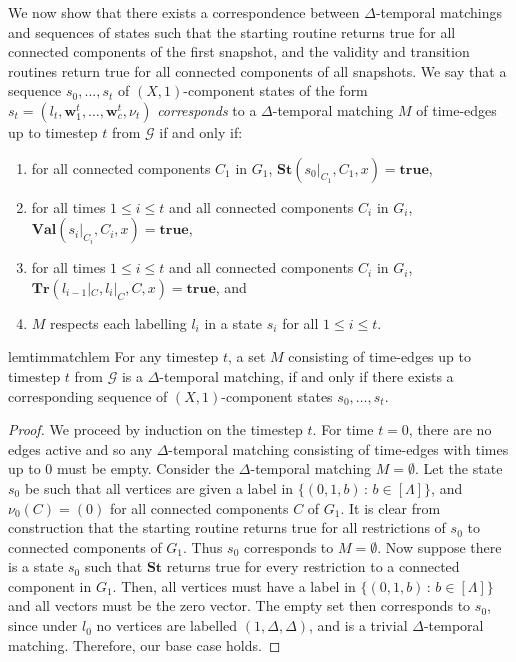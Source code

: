 \documentclass[a4paper,UKenglish,cleveref, autoref, thm-restate]{lipics-v2021} %
\begin{document}
\begin{toappendix}
We now show that there exists a correspondence between $\Delta$-temporal matchings and sequences of states such that the starting routine returns true for all connected components of the first snapshot, and the validity and transition routines return true for all connected components of all snapshots. We say that a sequence $s_0, ..., s_t$ of $(X,1)$-component states of the form $s_t=(l_t,\textbf{w}^t_1,\ldots,\textbf{w}^t_c, \nu_t)$ \textit{corresponds} to a $\Delta$-temporal matching $M$ of time-edges up to timestep $t$ from $\mathcal{G}$ if and only if:
\begin{enumerate}
    \item for all connected components $C_1$ in $G_1$, $\textbf{St}(s_0|_{C_1}, C_1,x)=\textbf{true}$,
    \item for all times $1\leq i\leq t$ and all connected components $C_{i}$ in $G_{i}$, $\textbf{Val}(s_{i}|_{C_{i}}, C_{i},x)=\textbf{true}$,
    \item for all times $1\leq i\leq t$ and all connected components $C_{i}$ in $G_{i}$, $\textbf{Tr}(l_{i-1}|_C, l_i|_C, C,x)=\textbf{true}$, and 
    \item $M$ respects each labelling $l_i$ in a state $s_i$ for all $1\leq i\leq t$.
\end{enumerate}

\begin{restatable}{lem}{timmatchlem}\label{lem:temp-match-tim}
    For any timestep $t$, a set $M$ consisting of time-edges up to timestep $t$ from $\mathcal{G}$ is a $\Delta$-temporal matching, if and only if there exists a corresponding sequence of $(X,1)$-component states $s_0, \ldots, s_t$.
\end{restatable}
\begin{proof}
    We proceed by induction on the timestep $t$. For time $t=0$, there are no edges active and so any $\Delta$-temporal matching consisting of time-edges with times up to $0$ must be empty. Consider the $\Delta$-temporal matching $M=\emptyset$. Let the state $s_0$ be such that all vertices are given a label in $\{(0,1,b)\,:\, b\in[\Lambda]\}$, and $\nu_0(C)=(0)$ for all connected components $C$ of $G_1$. It is clear from construction that the starting routine returns true for all restrictions of $s_0$ to connected components of $G_1$. Thus $s_0$ corresponds to $M=\emptyset$. Now suppose there is a state $s_0$ such that $\textbf{St}$ returns true for every restriction to a connected component in $G_1$. Then, all vertices must have a label in $\{(0,1,b)\,:\, b\in[\Lambda]\}$ and all vectors must be the zero vector. The empty set then corresponds to $s_0$, since under $l_0$ no vertices are labelled $(1,\Delta,\Delta)$, and is a trivial $\Delta$-temporal matching. Therefore, our base case holds.


\end{proof}
\end{toappendix}
\end{document}
